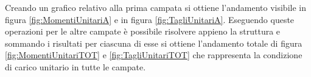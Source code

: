 Creando un grafico relativo alla prima campata si ottiene l'andamento visibile in figura \ref{fig:MomentiUnitariA} e in figura \ref{fig:TagliUnitariA}.
Eseguendo queste operazioni per le altre campate è possibile risolvere appieno la struttura e sommando i risultati per ciascuna di esse si ottiene l'andamento totale di figura \ref{fig:MomentiUnitariTOT} e \ref{fig:TagliUnitariTOT} che rappresenta la condizione di carico unitario in tutte le campate.
\begin{figure}[p]
\centering
{} \quad
{} \\
 \quad
{} \\
 \quad

\end{figure}

